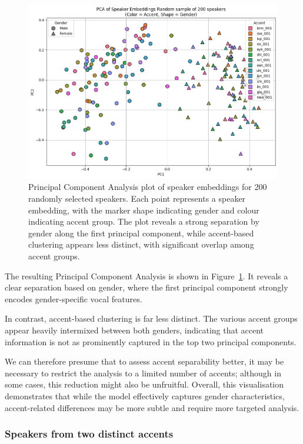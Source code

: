 \documentclass[conference]{IEEEtran}
\begin{document}
	\begin{figure}[H]
		\centering
		\includegraphics[width=1\linewidth]{img/img-cluster-all}
		\caption{Principal Component Analysis plot of speaker embeddings for 200 randomly selected speakers. Each point represents a speaker embedding, with the marker shape indicating gender and colour indicating accent group. The plot reveals a strong separation by gender along the first principal component, while accent-based clustering appears less distinct, with significant overlap among accent groups.}
		\label{fig:img-cluster-all}
	\end{figure}
	
	The resulting Principal Component Analysis is shown in Figure~\ref{fig:img-cluster-all}. It reveals a clear separation based on gender, where the first principal component strongly encodes gender-specific vocal features. 
	
	In contrast, accent-based clustering is far less distinct. The various accent groups appear heavily intermixed between both genders, indicating that accent information is not as prominently captured in the top two principal components. 
	
	We can therefore presume that to assess accent separability better, it may be necessary to restrict the analysis to a limited number of accents; although in some cases, this reduction might also be unfruitful. Overall, this visualisation demonstrates that while the model effectively captures gender characteristics, accent-related differences may be more subtle and require more targeted analysis.
	
	
	\subsubsection{Speakers from two distinct accents}
	
\end{document}
